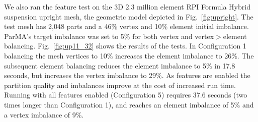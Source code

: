 We also ran the feature test on the 3D 2.3 million element RPI Formula Hybrid
suspension upright mesh, the geometric model depicted in
Fig.~\ref{fig:upright}. 
The test mesh has 2,048 parts and a 46\% vertex and 10\% element initial
imbalance.
ParMA's target imbalance was set to 5\% for both vertex and vertex$>$element
balancing.
Fig.~\ref{fig:up11_32} shows the results of the tests.
In Configuration 1 balancing the mesh vertices to 10\% increases the element
imbalance to 26\%.
The subsequent element balancing reduces the element imbalance to 5\% in 17.8
seconds, but increases the vertex imbalance to 29\%.
As features are enabled the partition quality and imbalances improve at the cost
of increased run time.
Running with all features enabled (Configuration 5) requires 37.6 seconds (two
times longer than Configuration 1), and reaches an element imbalance of 5\% and
a vertex imbalance of 9\%.

